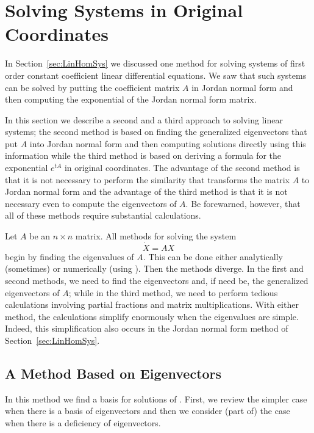 \section{Solving Systems in Original Coordinates}
\label{S:SEOC}

In Section~\ref{sec:LinHomSys} we discussed one method for solving systems of 
first order constant coefficient linear differential equations.   We saw that 
such systems can be solved by putting the coefficient matrix $A$ in Jordan 
normal form and then computing the exponential of the Jordan normal form 
matrix.  

In this section we describe a second and a third approach to solving linear 
systems; the second method is based on finding the generalized eigenvectors 
that put $A$ into Jordan normal form and then
computing solutions directly using this information while the third method is 
based on deriving a formula for the exponential 
$e^{tA}$ in original coordinates.  The advantage of the second method is
that it is not necessary to perform the similarity that transforms the matrix 
$A$ to Jordan normal form and the advantage of the third method is that it is 
not necessary even to compute the eigenvectors of $A$.  Be forewarned,
however, that all of these methods require substantial calculations.

Let $A$ be an $n\times n$ matrix.  All methods for solving the system 
\begin{equation} \label{dotX=AX}
\dot{X}=AX
\end{equation}
begin by finding the eigenvalues of $A$.  This can be done 
either analytically (sometimes) or numerically (using \Matlabp). Then the  
methods diverge.  In the first and second methods, we need to find the 
eigenvectors and, if need be, the generalized eigenvectors
 of $A$; while in the third method, we need to 
perform tedious calculations involving partial fractions and matrix 
multiplications.  With either method, the calculations simplify enormously 
when the eigenvalues are simple.  Indeed, this simplification also occurs in 
the Jordan normal form method of Section~\ref{sec:LinHomSys}.

\subsection*{A Method Based on Eigenvectors}
 
In this method we find a basis for solutions of .  First, we 
review the simpler case when there is a basis of eigenvectors and then we 
consider (part of) the case when there is a deficiency of eigenvectors.

